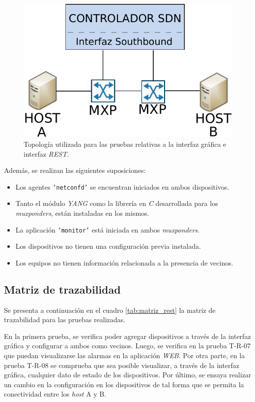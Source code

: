 \begin{figure}[H]
	\centering
	\includegraphics[scale=0.8]{Figures/topologiatest.pdf}
	\caption{Topología utilizada para las pruebas relativas a la interfaz gráfica e interfaz \textit{REST}.}
	\label{fig:test_topo_rest}
  \end{figure}


  Además, se realizan las siguientes suposiciones:

\begin{itemize}
	\item Los agentes \texttt{'netconfd'} se encuentran iniciados en ambos dispositivos.
    \item Tanto el módulo \textit{YANG} como la librería en \textit{C} desarrollada para los \textit{muxponders}, están instaladas en los mismos.
    \item La aplicación \texttt{'monitor'} está iniciada en ambos \textit{muxponders}.
    \item Los dispositivos no tienen una configuración previa instalada. 
    \item Los equipos no tienen información relacionada a la presencia de vecinos.
\end{itemize}


\subsection{Matriz de trazabilidad}

Se presenta a continuación en el cuadro \ref{tab:matriz_rest} la matriz de trazabilidad para las pruebas realizadas. 

En la primera prueba, se verifica poder agregar dispositivos a través de la interfaz gráfica y configurar a ambos como vecinos. 
Luego, se verifica en la prueba T-R-07 que puedan visualizarse las alarmas en la aplicación \textit{WEB}.
Por otra parte, en la prueba T-R-08 se comprueba que sea posible visualizar, a través de la interfaz gráfica, cualquier dato de estado de los dispositivos.
Por último, se ensaya realizar un cambio en la configuración en los dispositivos de tal forma que se permita la conectividad entre los \textit{host} A y B.
\\


